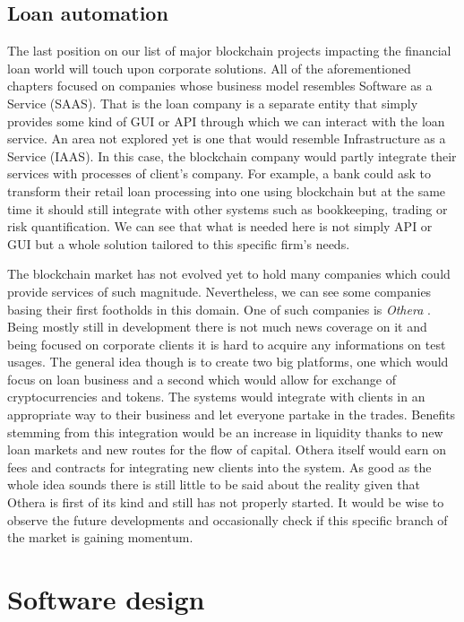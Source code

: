 \documentclass[a4paper,12pt,twoside,openany]{report}
\begin{document}
\section{Loan automation}

The last position on our list of major blockchain projects impacting the financial loan world will touch upon corporate solutions. All of the aforementioned chapters focused on companies whose business model resembles Software as a Service (SAAS). That is the loan company is a separate entity that simply provides some kind of GUI or API through which we can interact with the loan service. An area not explored yet is one that would resemble Infrastructure as a Service (IAAS). In this case, the blockchain company would partly integrate their services with processes of client's company. For example, a bank could ask to transform their retail loan processing into one using blockchain but at the same time it should still integrate with other systems such as bookkeeping, trading or risk quantification. We can see that what is needed here is not simply API or GUI but a whole solution tailored to this specific firm's needs.

The blockchain market has not evolved yet to hold many companies which could provide services of such magnitude. Nevertheless, we can see some companies basing their first footholds in this domain. One of such companies is \textit{Othera} \cite{othera}.  Being mostly still in development there is not much news coverage on it and being focused on corporate clients it is hard to acquire any informations on test usages. The general idea though is to create two big platforms, one which would focus on loan business and a second which would allow for exchange of cryptocurrencies and tokens. The systems would integrate with clients in an appropriate way to their business and let everyone partake in the trades. Benefits stemming from this integration would be an increase in liquidity thanks to new loan markets and new routes for the flow of capital. Othera itself would earn on fees and contracts for integrating new clients into the system. As good as the whole idea sounds there is still little to be said about the reality given that Othera is first of its kind and still has not properly started. It would be wise to observe the future developments and occasionally check if this specific branch of the market is gaining momentum.

\chapter{Software design}
\end{document}
